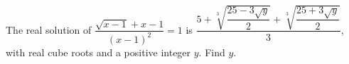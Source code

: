 The real solution of $\dfrac{\sqrt{x-1}+x-1}{(x-1)^2}=1$ is $\dfrac{5+\sqrt[3]{\dfrac{25-3\sqrt y}{2}}+\sqrt[3]{\dfrac{25+3\sqrt y}{2}}}{3}$, with real cube roots and a positive integer $y$. Find $y$.

